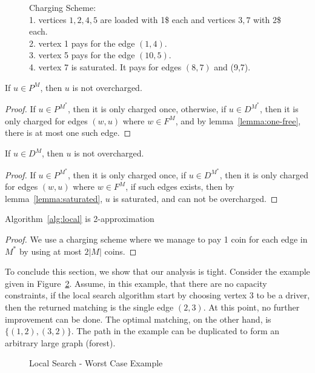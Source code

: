 \begin{figure}
\centering

\caption[]{
\label{fig:charging}
Charging Scheme:																	\\
1. vertices $1,2,4,5$ are loaded with 1\$ each and vertices $3,7$ with 2\$ each.	\\
2. vertex 1 pays for the edge $(1,4)$.												\\
3. vertex 5 pays for the edge $(10,5)$.												\\
4. vertex 7 is saturated. It pays for edges $(8,7)$ and (9,7). 
}
\end{figure}

\begin{lemma}
\label{lemma:p-not-charged}
If $u \in P^M$, then $u$ is not overcharged.
\end{lemma}

\begin{proof}
If $u \in P^{M^*}$, then it is only charged once, otherwise, 
if $u \in D^{M^*}$, then it is only charged for edges $(w, u)$ where $w \in F^M$,
and by lemma~\ref{lemma:one-free}, there is at most one such edge. 
\end{proof}

\begin{lemma}
\label{lemma:d-not-charged}
If $u \in D^M$, then $u$ is not overcharged.
\end{lemma}

\begin{proof}
If $u \in P^{M^*}$, then it is only charged once, 
if $u \in D^{M^*}$, then it is only charged for edges $(w, u)$ where $w \in F^M$,
if such edges exists, then by lemma~\ref{lemma:saturated}, $u$ is saturated, 
and can not be overcharged.
\end{proof}

\begin{theorem}
Algorithm~\ref{alg:local} is 2-approximation
\end{theorem}

\begin{proof}
We use a charging scheme where we manage to pay 1 coin for each edge in $M^*$
by using at most $2|M|$ coins.
\end{proof}


To conclude this section, we show that our analysis is tight.
Consider the example given in Figure~\ref{fig:localtight}.
Assume, in this example, that there are no capacity constraints,
if the local search algorithm start by choosing vertex $3$ to be a driver, 
then the returned matching is the single edge $(2,3)$.
At this point, no further improvement can be done.
The optimal matching, on the other hand, is $\{(1, 2), (3, 2)\}$. 
The path in the example can be duplicated to form an arbitrary large graph (forest).

\begin{figure} 

\caption{
\label{fig:localtight}
Local Search - Worst Case Example
}
\end{figure}